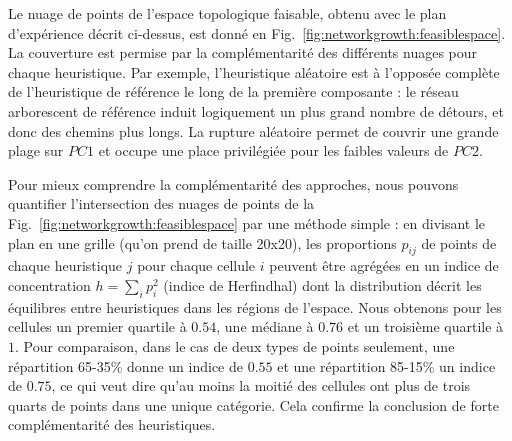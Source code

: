  
Le nuage de points de l'espace topologique faisable, obtenu avec le plan d'expérience décrit ci-dessus, est donné en Fig.~\ref{fig:networkgrowth:feasiblespace}. La couverture est permise par la complémentarité des différents nuages pour chaque heuristique. Par exemple, l'heuristique aléatoire est à l'opposée complète de l'heuristique de référence le long de la première composante : le réseau arborescent de référence induit logiquement un plus grand nombre de détours, et donc des chemins plus longs. La rupture aléatoire permet de couvrir une grande plage sur $PC1$ et occupe une place privilégiée pour les faibles valeurs de $PC2$.



Pour mieux comprendre la complémentarité des approches, nous pouvons quantifier l'intersection des nuages de points de la Fig.~\ref{fig:networkgrowth:feasiblespace} par une méthode simple : en divisant le plan en une grille (qu'on prend de taille 20x20), les proportions $p_{ij}$ de points de chaque heuristique $j$ pour chaque cellule $i$ peuvent être agrégées en un indice de concentration $h = \sum_i p_i^2$ (indice de Herfindhal) dont la distribution décrit les équilibres entre heuristiques dans les régions de l'espace. Nous obtenons pour les cellules un premier quartile à $0.54$, une médiane à $0.76$ et un troisième quartile à $1$. Pour comparaison, dans le cas de deux types de points seulement, une répartition 65-35\% donne un indice de $0.55$ et une répartition 85-15\% un indice de $0.75$, ce qui veut dire qu'au moins la moitié des cellules ont plus de trois quarts de points dans une unique catégorie. Cela confirme la conclusion de forte complémentarité des heuristiques.


